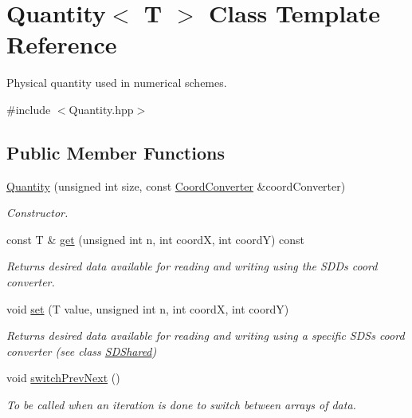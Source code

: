 \hypertarget{classQuantity}{}\section{Quantity$<$ T $>$ Class Template Reference}
\label{classQuantity}


Physical quantity used in numerical schemes.  




{\ttfamily \#include $<$Quantity.\+hpp$>$}

\subsection*{Public Member Functions}
\begin{DoxyCompactItemize}
\item 
\mbox{\hyperlink{classQuantity_ab07b278cfe453e82756684b1730efc95}{Quantity}} (unsigned int size, const \mbox{\hyperlink{classCoordConverter}{Coord\+Converter}} \&coord\+Converter)
\begin{DoxyCompactList}\small\item\em Constructor. \end{DoxyCompactList}\item 
const T \& \mbox{\hyperlink{classQuantity_ac89252c633f43297f2df6fd6291c94b4}{get}} (unsigned int n, int coordX, int coordY) const
\begin{DoxyCompactList}\small\item\em Returns desired data available for reading and writing using the S\+DD\textquotesingle{}s coord converter. \end{DoxyCompactList}\item 
void \mbox{\hyperlink{classQuantity_a10c68498d1dfe59535a6f07c0627c8d4}{set}} (T value, unsigned int n, int coordX, int coordY)
\begin{DoxyCompactList}\small\item\em Returns desired data available for reading and writing using a specific S\+DS\textquotesingle{}s coord converter (see class \mbox{\hyperlink{classSDShared}{S\+D\+Shared}}) \end{DoxyCompactList}\item 
\mbox{\label{classQuantity_af0799b7702ab9c7724399a6d76a41ea9}} 
void \mbox{\hyperlink{classQuantity_af0799b7702ab9c7724399a6d76a41ea9}{switch\+Prev\+Next}} ()
\begin{DoxyCompactList}\small\item\em To be called when an iteration is done to switch between arrays of data. \end{DoxyCompactList}\item 

\end{DoxyCompactItemize}
